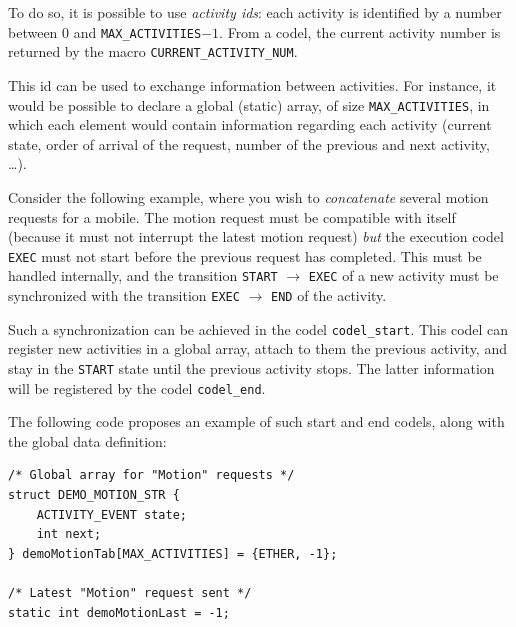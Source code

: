 To  do so, it is  possible to use \emph{activity  ids}: each activity is
identified by a number between  $0$ and \texttt{MAX\_ACTIVITIES}$-1$. From a
codel,   the current  activity number  is    returned by the  macro  
\texttt{CURRENT\_ACTIVITY\_NUM}.

This  id can be  used  to exchange   information between activities.  For
instance, it would  be possible to  declare  a global (static) array,  of
size \texttt{MAX\_ACTIVITIES},    in which   each  element   would  contain
information regarding each activity  (current state, order of  arrival of
the request, number of the previous and next activity, \ldots).

Consider  the following  example,  where  you wish  to \emph{concatenate}
several motion  requests  for a   mobile.  The  motion  request  must  be
compatible with  itself (because it must not  interrupt the latest motion
request)  \emph{but} the execution codel  \texttt{EXEC} must not start before
the previous request has completed.  This must be handled internally, and
the  transition \texttt{START}  $\rightarrow$  \texttt{EXEC}  of a new activity
must be  synchronized with the  transition \texttt{EXEC} $\rightarrow$ 
\texttt{END} of the activity.

Such  a  synchronization     can  be  achieved   in     the   codel  
\texttt{codel\_start}. This codel can register new activities in a global
array, attach to them the previous activity, and  stay in the \texttt{START}
state  until the previous activity  stops. The latter information will be
registered by the codel \texttt{codel\_end}.

The following  code  proposes an  example of such   start and end codels,
along with the global data definition:


\begin{center}\begin{cartouche}\small\begin{verbatim}
/* Global array for "Motion" requests */
struct DEMO_MOTION_STR {
    ACTIVITY_EVENT state;
    int next;
} demoMotionTab[MAX_ACTIVITIES] = {ETHER, -1};

/* Latest "Motion" request sent */
static int demoMotionLast = -1; 
\end{verbatim}\end{cartouche}\end{center}

